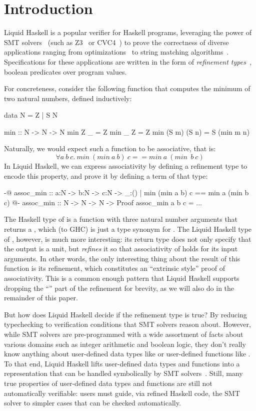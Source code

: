 \section{Introduction}

Liquid Haskell\cite{liquidHaskell} is a popular verifier for Haskell
programs, leveraging the power of SMT solvers~\cite{BarST-RR-10} (such
as Z3~\cite{Z3} or CVC4~\cite{CVC4}) to prove the correctness of
diverse applications ranging from optimizations~\cite{TPE2018} to
string matching algorithms~\cite{TaleOfTwoProvers}. Specifications for
these applications are written in the form of {\em refinement
  types}~\cite{RefinementForML}, boolean predicates over program
values.

For concreteness, consider the following  function that
computes the minimum of two natural numbers, defined inductively:
\begin{code}
  data N = Z | S N
  
  min :: N -> N -> N 
  min Z _ = Z
  min _ Z = Z
  min (S m) (S n) = S (min m n)
\end{code}

\newcommand{\imin}{\textit{min}~}
Naturally, we would expect such a function to be associative, that is:
$$ \forall a ~ b ~ c. ~ \imin (\imin a~b)~c == \imin a~(\imin~b~c) $$
%
In Liquid Haskell, we can express associativity by defining a
refinement type to encode this property, and prove it by defining
a term of that type:
%
\begin{code}
  {-@ assoc_min :: a:N -> b:N -> c:N ->
      {_:() | min (min a b) c == min a (min b c)}
  @-}
  assoc_min :: N -> N -> N -> Proof
  assoc_min a b c = ...
\end{code}
%
The Haskell type of  is a function with three natural
number arguments that returns a , which (to GHC) is just a
type synonym for \LC{()}. The Liquid Haskell type of ,
however, is much more interesting: its return type does not only
specify that the output is a unit, but {\em refines} it so that
associativity of  holds for its input arguments. In other
words, the only interesting thing about the result of this function
is its refinement, which constitutes an ``extrinsic style'' proof
of associativity. This is a common enough pattern that Liquid Haskell
supports dropping the ``\LC{_:()}'' part of the refinement for brevity,
as we will also do in the remainder of this paper.

But how does Liquid Haskell decide if the refinement type is true? By
reducing typechecking to verification conditions that SMT solvers
reason about. However, while SMT solvers are pre-programmed with a
wide assortment of facts about various domains such as integer
arithmetic and boolean logic, they don't really know anything about
user-defined data types like  or user-defined functions like
. To that end, Liquid Haskell lifts user-defined data types
and functions into a representation that can be handled symbolically
by SMT solvers~\cite{VazouTCSNWJ18}. Still, many true properties of
user-defined data types and functions are still not automatically
verifiable: users must guide, via refined Haskell code, the SMT solver
to simpler cases that can be checked automatically.

